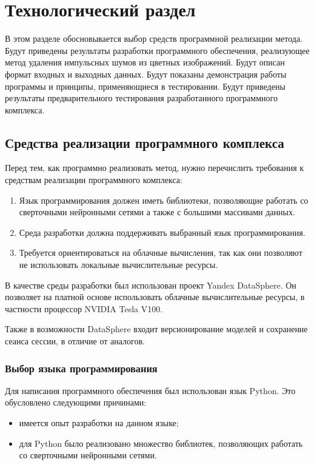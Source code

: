 \section{Технологический раздел}
В этом разделе обосновывается выбор средств программной реализации метода.
Будут приведены результаты разработки программного обеспечения, реализующее метод удаления импульсных шумов из цветных изображений.
Будут описан формат входных и выходных данных.
Будут показаны демонстрация работы программы и принципы, применяющиеся в тестировании.
Будут приведены результаты предварительного тестирования разработанного программного комплекса.

\subsection{Средства реализации программного комплекса}
Перед тем, как программно реализовать метод, нужно перечислить требования к средствам реализации программного комплекса:
\begin{enumerate}
	\item Язык программирования должен иметь библиотеки, позволяющие работать со сверточными нейронными сетями а также с большими массивами данных.
	\item Среда разработки должна поддерживать выбранный язык программирования.
	\item Требуется ориентироваться на облачные вычисления, так как они позволяют не использовать локальные вычислительные ресурсы.
\end{enumerate}

В качестве среды разработки был использован проект Yandex DataSphere.
Он позволяет на платной основе использовать облачные вычислительные ресурсы, в частности процессор NVIDIA Tesla V100.

Также в возможности DataSphere входит версионирование моделей и сохранение сеанса сессии, в отличие от аналогов.

\subsubsection{Выбор языка программирования}
Для написания программного обеспечения был использован язык Python.
Это обусловлено следующими причинами:
\begin{itemize}
	\item имеется опыт разработки на данном языке;
	\item для Python было реализовано множество библиотек, позволяющих работать со сверточными нейронными сетями.
\end{itemize}

